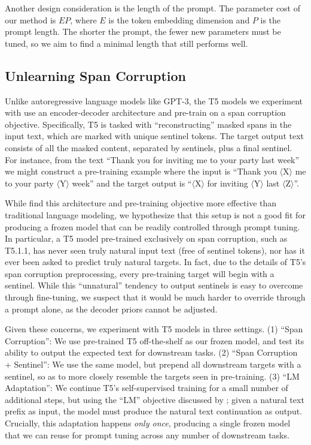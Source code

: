 Another design consideration is the length of the prompt. The parameter cost of our method is $EP$, where $E$ is the token embedding dimension and $P$ is the prompt length. The shorter the prompt, the fewer new parameters must be tuned, so we aim to find a minimal length that still performs well.

\subsection{Unlearning Span Corruption}
\label{sec:span_corruption}

Unlike autoregressive language models like \mbox{GPT-3}, the T5 models we experiment with use an encoder-decoder architecture and pre-train on a span corruption objective. Specifically, T5 is tasked with ``reconstructing'' masked spans in the input text, which are marked with unique sentinel tokens. The target output text consists of all the masked content, separated by sentinels, plus a final sentinel. For instance, from the text ``Thank you for inviting me to your party last week'' we might construct a pre-training example where the input is ``Thank you $\langle$X$\rangle$ me to your party $\langle$Y$\rangle$ week'' and the target output is ``$\langle$X$\rangle$ for inviting $\langle$Y$\rangle$ last $\langle$Z$\rangle$''.

While \citet{raffel_2020_t5} find this architecture and pre-training objective more effective than traditional language modeling, we hypothesize that this setup is not a good fit for producing a frozen model that can be readily controlled through prompt tuning. In particular, a T5 model pre-trained exclusively on span corruption, such as T5.1.1, has never seen truly natural input text (free of sentinel tokens), nor has it ever been asked to predict truly natural targets. In fact, due to the details of T5's span corruption preprocessing, every pre-training target will begin with a sentinel. While this ``unnatural'' tendency to output sentinels is easy to overcome through fine-tuning, we suspect that it would be much harder to override through a prompt alone, as the decoder priors cannot be adjusted.

Given these concerns, we experiment with T5 models in three settings. (1) ``Span Corruption'': We use pre-trained T5 off-the-shelf as our frozen model, and test its ability to output the expected text for downstream tasks. (2) ``Span Corruption + Sentinel'': We use the same model, but prepend all downstream targets with a sentinel, so as to more closely resemble the targets seen in pre-training. (3) ``LM Adaptation'': We continue T5's self-supervised training for a small number of additional steps, but using the ``LM'' objective discussed by \citet{raffel_2020_t5}; given a natural text prefix as input, the model must produce the natural text continuation as output. Crucially, this adaptation happens \emph{only once}, producing a single frozen model that we can reuse for prompt tuning across any number of downstream tasks.


